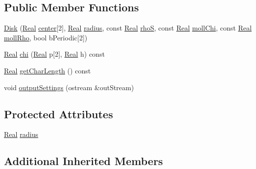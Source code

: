 \subsection*{Public Member Functions}
\begin{DoxyCompactItemize}
\item 
\hyperlink{class_disk_a8402960d71a12fb9e372d3ea1b974b92}{Disk} (\hyperlink{_h_d_f5_dumper_8h_a445a5f0e2a34c9d97d69a3c2d1957907}{Real} \hyperlink{class_shape_a865a04fe67fc785b3cbb44806a214248}{center}\mbox{[}2\mbox{]}, \hyperlink{_h_d_f5_dumper_8h_a445a5f0e2a34c9d97d69a3c2d1957907}{Real} \hyperlink{class_disk_ae6a9adac6c5dd96d63d0a3345f90499d}{radius}, const \hyperlink{_h_d_f5_dumper_8h_a445a5f0e2a34c9d97d69a3c2d1957907}{Real} \hyperlink{class_shape_a181acdc3063f20a15ba1807f7b6a5d10}{rho\+S}, const \hyperlink{_h_d_f5_dumper_8h_a445a5f0e2a34c9d97d69a3c2d1957907}{Real} \hyperlink{class_shape_ad7d270a8ffc4056d4990424dffdd0488}{moll\+Chi}, const \hyperlink{_h_d_f5_dumper_8h_a445a5f0e2a34c9d97d69a3c2d1957907}{Real} \hyperlink{class_shape_af5aa25175d49bc463fada7b11f2735e1}{moll\+Rho}, bool b\+Periodic\mbox{[}2\mbox{]})
\item 
\hyperlink{_h_d_f5_dumper_8h_a445a5f0e2a34c9d97d69a3c2d1957907}{Real} \hyperlink{class_disk_a89a8a1a2c88dd07df5fec2c49e6359b4}{chi} (\hyperlink{_h_d_f5_dumper_8h_a445a5f0e2a34c9d97d69a3c2d1957907}{Real} p\mbox{[}2\mbox{]}, \hyperlink{_h_d_f5_dumper_8h_a445a5f0e2a34c9d97d69a3c2d1957907}{Real} h) const 
\item 
\hyperlink{_h_d_f5_dumper_8h_a445a5f0e2a34c9d97d69a3c2d1957907}{Real} \hyperlink{class_disk_a53a89fd99f0f2e35243622f3c96d7f83}{get\+Char\+Length} () const 
\item 
void \hyperlink{class_disk_a6ebb0b61828eb8396977fff0e84d5480}{output\+Settings} (ostream \&out\+Stream)
\end{DoxyCompactItemize}
\subsection*{Protected Attributes}
\begin{DoxyCompactItemize}
\item 
\hyperlink{_h_d_f5_dumper_8h_a445a5f0e2a34c9d97d69a3c2d1957907}{Real} \hyperlink{class_disk_ae6a9adac6c5dd96d63d0a3345f90499d}{radius}
\end{DoxyCompactItemize}
\subsection*{Additional Inherited Members}


